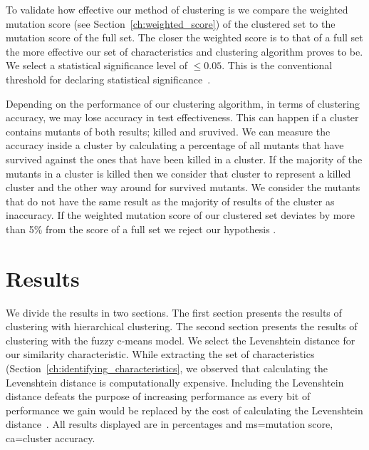 \documentclass[conference,draftclsnofoot,onecolumn]{IEEEtran}
\begin{document}
To validate how effective our method of clustering is we compare the weighted mutation score (see Section~\ref{ch:weighted_score}) of the clustered set to the mutation score of the full set.
The closer the weighted score is to that of a full set the more effective our set of characteristics and clustering algorithm proves to be.
We select a statistical significance level of $\leq 0.05$.
This is the conventional threshold for declaring statistical significance~\cite{Kirk1996PracticalCome}.

Depending on the performance of our clustering algorithm, in terms of clustering accuracy, we may lose accuracy in test effectiveness. 
This can happen if a cluster contains mutants of both results; killed and sruvived. 
We can measure the accuracy inside a cluster by calculating a percentage of all mutants that have survived against the ones that have been killed in a cluster.
If the majority of the mutants in a cluster is killed then we consider that cluster to represent a killed cluster and the other way around for survived mutants.
We consider the mutants that do not have the same result as the majority of results of the cluster as inaccuracy.
If the weighted mutation score of our clustered set deviates by more than 5\% from the score of a full set we reject our hypothesis .

\section{Results}
\label{ch:results}
We divide the results in two sections. The first section presents the results of clustering with hierarchical clustering. The second section presents the results of clustering with the fuzzy c-means model.
We select the Levenshtein distance for our similarity characteristic\cite{thesis}.
While extracting the set of characteristics (Section~\ref{ch:identifying_characteristics}, we observed that calculating the Levenshtein distance is computationally expensive.
Including the Levenshtein distance defeats the purpose of increasing performance as every bit of performance we gain would be replaced by the cost of calculating the Levenshtein distance~\cite{thesis}.
All results displayed are in percentages and ms=mutation score, ca=cluster accuracy.
\end{document}
